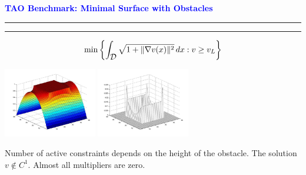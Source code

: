 \documentclass{seminar}
\newcommand{\grad}{\nabla}
\newcommand{\redstripe}{\textcolor{red}{\hrule height 2.0pt\hfil}
             \vspace{-1.8pt}
             \textcolor{red}{\hrule height 1.0pt\hfil}
}
\newcommand{\heading}[1]{%
   \centerline{\textcolor{blue}{\textbf{#1}}}%
    \redstripe%
    \bigskip
}
\newcommand{\cD} {\mbox{$\cal D$}}
\begin{document}
\begin{slide}

\heading{TAO Benchmark: Minimal Surface with Obstacles}

\[
\min 
\left \{
\int_{ \cD } \sqrt { 1 + \| \grad v (x) \| ^ 2 } \, d x : v \ge v_L
\right \}
\]

\medskip

\begin{center}
\ifpdf
\includegraphics[height=1.2in]{../images/mso_s}
\qquad
\includegraphics[height=1.2in]{../images/mso_e}
\else
\fi
\end{center}

\bigskip

Number of active constraints depends on the height of the
obstacle. The solution $ v \notin C^1 $.
Almost all multipliers are zero. 

\vfill

\end{slide}
\end{document}
